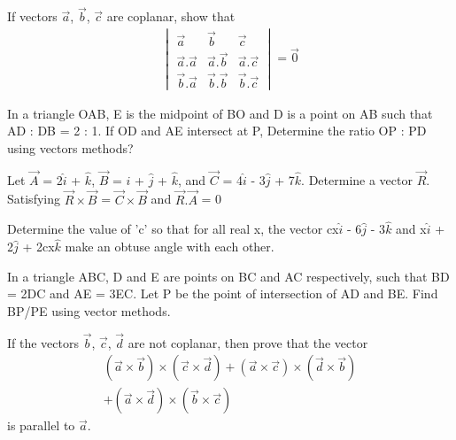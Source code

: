 \item If vectors $\overrightarrow{a}$, $\overrightarrow{b}$, $\overrightarrow{c}$ are coplanar, show that
\begin{align*}
\begin{vmatrix}
\overrightarrow{a} & \overrightarrow{b} & \overrightarrow{c} \\ 
\overrightarrow{a} . \overrightarrow{a} & \overrightarrow{a} . \overrightarrow{b} & \overrightarrow{a} . \overrightarrow{c} \\ 
\overrightarrow{b} . \overrightarrow{a} & \overrightarrow{b} . \overrightarrow{b} & \overrightarrow{b} . \overrightarrow{c}
\end{vmatrix} = \overrightarrow{0}
\end{align*}

\item In a triangle OAB, E is the midpoint of BO and D is a point on AB such that AD : DB = 2 : 1. If OD and AE intersect at P, Determine the ratio OP : PD using vectors methods?

\item Let $\overrightarrow{A}$ = 2$\hat{i}$ + $\hat{k}$, $\overrightarrow{B}$ = $\hat{i}$ + $\hat{j}$ + $\hat{k}$, and 
$\overrightarrow{C}$ = 4$\hat{i}$ - 3$\hat{j}$ + 7$\hat{k}$. Determine a vector $\overrightarrow{R}$. Satisfying 
$\overrightarrow{R} \times \overrightarrow{B}$ = $\overrightarrow{C} \times \overrightarrow{B}$ and $\overrightarrow{R}.\overrightarrow{A}$ = 0

\item Determine the value of 'c' so that for all real x, the vector cx$\hat{i}$ - 6$\hat{j}$ - 3$\hat{k}$ and 
x$\hat{i}$ + 2$\hat{j}$ + 2cx$\hat{k}$ make an obtuse angle with each other.

\item In a triangle ABC, D and E are points on BC and AC respectively, such that BD = 2DC and AE = 3EC. Let P be the point of intersection of AD and BE. Find BP/PE using vector methods.

\item If the vectors $\overrightarrow{b}$, $\overrightarrow{c}$, $\overrightarrow{d}$ are not coplanar, then prove that the vector
\begin{align*}
(\overrightarrow{a} \times \overrightarrow{b}) \times (\overrightarrow{c} \times \overrightarrow{d}) + (\overrightarrow{a} \times \overrightarrow{c}) \times (\overrightarrow{d} \times \overrightarrow{b})\\ + 
(\overrightarrow{a} \times \overrightarrow{d}) \times (\overrightarrow{b} \times \overrightarrow{c})
\end{align*}
is parallel to $\overrightarrow{a}$.

